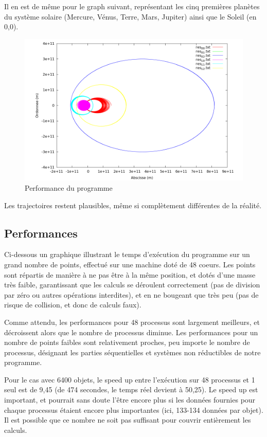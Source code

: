 \documentclass[a4paper,11pt]{article}
\begin{document}
Il en est de même pour le graph suivant, représentant les cinq premières planètes du système solaire (Mercure, Vénus, Terre, Mars, Jupiter) ainsi que le Soleil (en 0,0).
\begin{figure}[h!]
  \centering
  \includegraphics[width=\textwidth]{systeme.png}
  \caption{Performance du programme}
  \label{perf}
\end{figure}
Les trajectoires restent plausibles, même si complètement différentes de la réalité.  
\subsection{Performances}
Ci-dessous un graphique illustrant le temps d'exécution du programme sur un grand nombre de points, effectué sur une machine doté de 48 coeurs. 
Les points sont répartis de manière à ne pas être à la même position, et dotés d'une masse très faible, garantissant que les calculs se déroulent correctement (pas de division par zéro ou autres opérations interdites), et en ne bougeant que très peu (pas de risque de collision, et donc de calculs faux). 


Comme attendu, les performances pour 48 processus sont largement meilleurs, et décroissent alors que le nombre de processus diminue.
Les performances pour un nombre de points faibles sont relativement proches, peu importe le nombre de processus, désignant les parties séquentielles et systèmes non réductibles de notre programme.

Pour le cas avec 6400 objets, le speed up entre l'exécution sur 48 processus et 1 seul est de 9,45 (de 474 secondes, le temps réel devient à 50,25).
Le speed up est important, et pourrait sans doute l'être encore plus si les données fournies pour chaque processus étaient encore plus importantes (ici, 133-134 données par objet).
Il est possible que ce nombre ne soit pas suffisant pour couvrir entièrement les calculs.
\end{document}
